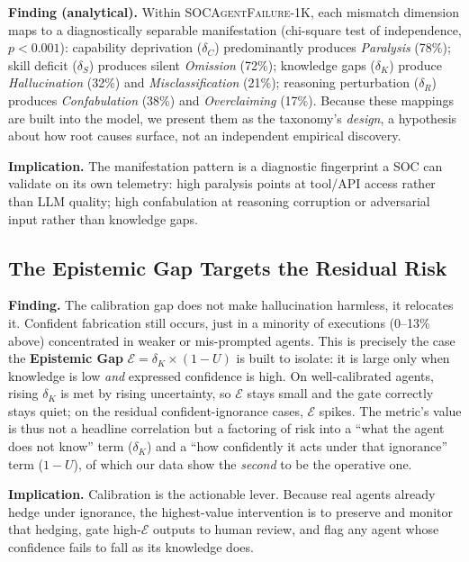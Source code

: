 \documentclass[journal,compsoc]{IEEEtran}
\newcommand{\SAFK}{\textsc{SOCAgentFailure-1K}}
\begin{document}
\textbf{Finding (analytical).} Within \SAFK{}, each mismatch dimension
maps to a diagnostically separable manifestation (chi-square test of
independence, $p < 0.001$): capability deprivation ($\delta_C$)
predominantly produces \textit{Paralysis} (78\%); skill deficit
($\delta_S$) produces silent \textit{Omission} (72\%); knowledge gaps
($\delta_K$) produce \textit{Hallucination} (32\%) and
\textit{Misclassification} (21\%); reasoning perturbation ($\delta_R$)
produces \textit{Confabulation} (38\%) and \textit{Overclaiming}
(17\%). Because these mappings are built into the model, we present them
as the taxonomy's \textit{design}, a hypothesis about how root causes
surface, not an independent empirical discovery.

\textbf{Implication.} The manifestation pattern is a diagnostic
fingerprint a SOC can validate on its own telemetry: high paralysis points
at tool/API access rather than LLM quality; high confabulation at reasoning
corruption or adversarial input rather than knowledge gaps.

\subsection{The Epistemic Gap Targets the Residual Risk}

\textbf{Finding.} The calibration gap does not make hallucination
harmless, it relocates it. Confident fabrication still occurs, just in
a minority of executions (0--13\% above) concentrated in weaker or
mis-prompted agents. This is precisely the case the \textbf{Epistemic
Gap} $\mathcal{E} = \delta_K \times (1 - U)$ is built to isolate: it is
large only when knowledge is low \textit{and} expressed confidence is
high. On well-calibrated agents, rising $\delta_K$ is met by rising
uncertainty, so $\mathcal{E}$ stays small and the gate correctly stays
quiet; on the residual confident-ignorance cases, $\mathcal{E}$ spikes.
The metric's value is thus not a headline correlation but a factoring
of risk into a ``what the agent does not know'' term ($\delta_K$) and a
``how confidently it acts under that ignorance'' term ($1 - U$), of
which our data show the \textit{second} to be the operative one.

\textbf{Implication.} Calibration is the actionable lever. Because
real agents already hedge under ignorance, the highest-value
intervention is to preserve and monitor that hedging, gate high-$\mathcal{E}$
outputs to human review, and flag any agent whose confidence fails to
fall as its knowledge does.
\end{document}
